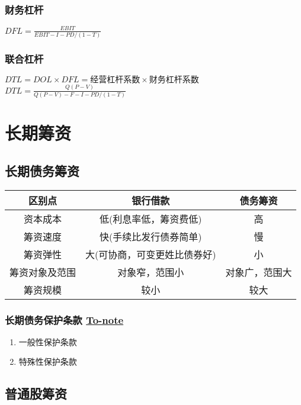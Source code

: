 \documentclass[11pt]{article}
\begin{document}
\subsubsection{财务杠杆}
\label{sec:org5b77715}
\(DFL=\frac{EBIT}{EBIT-I-PD/(1-T)}\)
\subsubsection{联合杠杆}
\label{sec:org730ceed}
\(DTL=DOL\times DFL=经营杠杆系数\times 财务杠杆系数\)
\(DTL=\frac{Q(P-V)}{Q(P-V)-F-I-PD/(1-T)}\)
\section{长期筹资}
\label{sec:org897545c}
\subsection{长期债务筹资}
\label{sec:orgcc280e6}
\begin{center}
\begin{tabular}{ccc}
区别点 & 银行借款 & 债务筹资\\
\hline
资本成本 & 低(利息率低，筹资费低) & 高\\
筹资速度 & 快(手续比发行债券简单) & 慢\\
筹资弹性 & 大(可协商，可变更姓比债券好) & 小\\
筹资对象及范围 & 对象窄，范围小 & 对象广，范围大\\
筹资规模 & 较小 & 较大\\
\end{tabular}
\end{center}
\subsubsection{长期债务保护条款  \href{20210422164900-to\_note.org}{To-note}}
\label{sec:orgcadafe1}
\begin{enumerate}
\item 一般性保护条款
\label{sec:org3674745}
\item 特殊性保护条款
\label{sec:org3fc2374}
\end{enumerate}
\subsection{普通股筹资}
\label{sec:org054a616}
\end{document}
